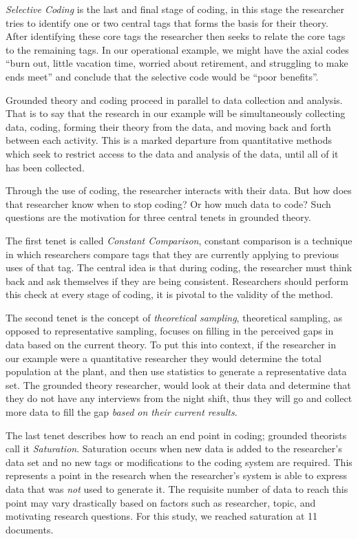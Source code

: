 \documentclass[sigconf]{acmart}
\begin{document}
\emph{Selective Coding} is the last and final stage of coding, in this stage the
researcher tries to identify one or two central tags that forms the basis for
their theory. After identifying these core tags the researcher then seeks to
relate the core tags to the remaining tags. In our operational example, we might
have the axial codes ``burn out, little vacation time, worried about retirement,
and struggling to make ends meet'' and conclude that the selective code would be
``poor benefits''.
 
Grounded theory and coding proceed in parallel to data collection and analysis.
That is to say that the research in our example will be simultaneously
collecting data, coding, forming their theory from the data, and moving back and
forth between each activity. This is a marked departure from quantitative
methods which seek to restrict access to the data and analysis of the data,
until all of it has been collected\cite{charmaz2006constructing}.


Through the use of coding, the researcher interacts with their
data. But how does that researcher know when to stop coding? Or how much data to
code? Such questions are the motivation for three central tenets in grounded
theory. 
 
The first tenet is called \emph{Constant Comparison}, constant comparison is a
technique in which researchers compare tags that they are currently applying to
previous uses of that tag. The central idea is that during coding, the
researcher must think back and ask themselves if they are being consistent.
Researchers should perform this check at every stage of coding, it is pivotal to
the validity of the method\cite{Strauss67discoveryof}.
 
The second tenet is the concept of \emph{theoretical sampling}, theoretical
sampling, as opposed to representative sampling, focuses on filling in the
perceived gaps in data based on the current theory. To put this into context, if
the researcher in our example were a quantitative researcher they would
determine the total population at the plant, and then use statistics to generate
a representative data set. The grounded theory researcher, would look at their
data and determine that they do not have any interviews from the night shift,
thus they will go and collect more data to fill the gap \emph{based on their
  current results}.
 
The last tenet describes how to reach an end point in coding; grounded theorists
call it \emph{Saturation}. Saturation occurs when new data is added to the
researcher's data set and no new tags or modifications to the coding system are
required. This represents a point in the research when the researcher's system
is able to express data that was \emph{not} used to generate it. The requisite
number of data to reach this point may vary drastically based on factors such as
researcher, topic, and motivating research questions. For this study, we reached
saturation at 11 documents.
\end{document}
